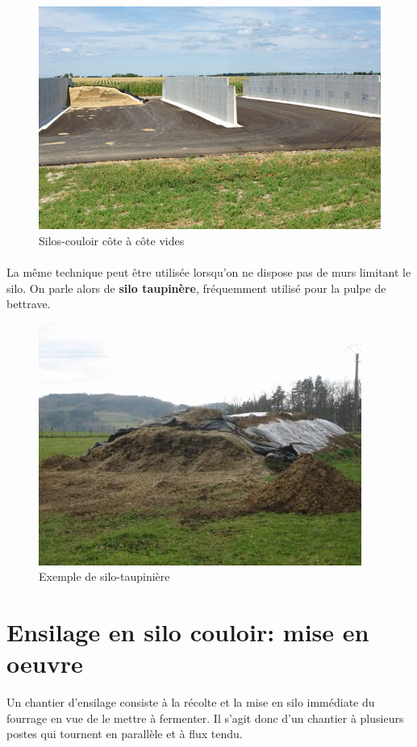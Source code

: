 \documentclass[12pt,a4paper]{report}
\begin{document}
\begin{figure}[H]
	\centering
	\includegraphics[width=0.7\linewidth]{img/silo-fosse}
	\caption{Silos-couloir côte à côte vides}
	\label{fig:silo-fosse}
\end{figure}



\paragraph{} La même technique peut être utilisée lorsqu'on ne dispose pas de murs limitant le silo. On parle alors de \textbf{silo taupinère}, fréquemment utilisé pour la pulpe de bettrave.

\begin{figure}[H]
	\centering
	\includegraphics[width=0.7\linewidth]{img/silo-taupe}
	\caption{Exemple de silo-taupinière}
	\label{fig:silo-taupe}
\end{figure}


\section{Ensilage en silo couloir: mise en oeuvre}

Un chantier d'ensilage consiste à la récolte et la mise en silo immédiate du fourrage en vue de le mettre à fermenter. Il s'agit donc d'un chantier à plusieurs postes qui tournent en parallèle et à flux tendu.
\end{document}
